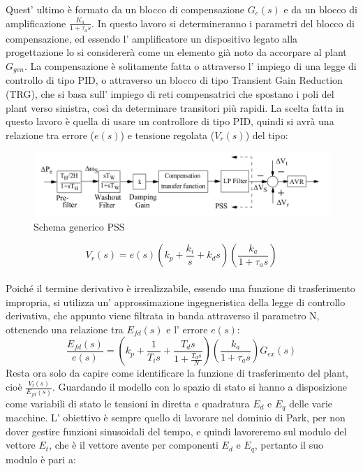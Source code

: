 \documentclass[Lau,noexaminfo]{sapthesis}
\begin{document}
	Quest' ultimo è formato da un blocco di compensazione $G_c(s)$ e da un blocco di amplificazione $\frac{K_a}{1+\tau_as}$. In questo lavoro si determineranno i parametri del blocco di compensazione, ed essendo l' amplificatore un dispositivo legato alla progettazione lo si considererà come un elemento già noto da accorpare al plant $G_{gen}$. La compensazione è solitamente fatta o attraverso l' impiego di una legge di controllo di tipo PID, o attraverso un blocco di tipo Transient Gain Reduction (TRG), che si basa sull' impiego di reti compensatrici che spostano i poli del plant verso sinistra, così da determinare transitori più rapidi. La scelta fatta in questo lavoro è quella di usare un controllore di tipo PID, quindi si avrà una relazione tra errore ($e(s)$) e tensione regolata ($V_r(s)$) del tipo:
	\begin{figure}
		\centering
		\includegraphics[height=0.13\textheight]{PSS}
		\caption{Schema generico PSS}
	\end{figure}
	\begin{equation*}
	V_r(s)=e(s)(k_p+\frac{k_i}{s}+k_ds)(\frac{k_a}{1+\tau_as})
	\end{equation*}\\
	Poiché il termine derivativo è irrealizzabile, essendo una funzione di trasferimento impropria, si utilizza un' approssimazione ingegneristica della legge di controllo derivativa, che appunto viene filtrata in banda attraverso il parametro N, ottenendo una relazione tra $E_{fd}(s)$ e l' errore $e(s)$:\\
	\begin{equation*}
	\frac{E_{fd}(s)}{e(s)}=(k_p+\frac{1}{T_is}+\frac{T_ds}{1+\frac{T_d s}{N}})(\frac{k_a}{1+\tau_as})G_{ex}(s)
	\end{equation*}
	Resta ora solo da capire come identificare la funzione di trasferimento del plant, cioè $\frac{V_t(s)}{E_{fd}(s)}$. Guardando il modello con lo spazio di stato si hanno a disposizione come variabili di stato le tensioni in diretta e quadratura $E_d$ e $E_q$ delle varie macchine. L' obiettivo è sempre quello di lavorare nel dominio di Park, per non dover gestire funzioni sinusoidali del tempo, e quindi lavoreremo sul modulo del vettore $E_t$, che è il vettore avente per componenti $E_d$ e $E_q$, pertanto il suo modulo è pari a:
\end{document}
